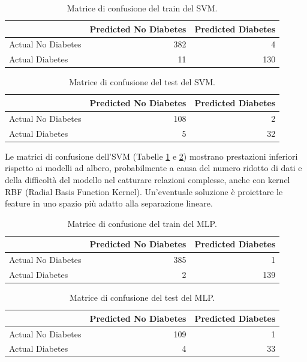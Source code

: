 \documentclass[conference]{IEEEtran}
\begin{document}
\begin{table}[H]
\centering
\small
\begin{tabular}{lrr}
\toprule
 & Predicted No Diabetes & Predicted Diabetes \\
\midrule
Actual No Diabetes & 382 & 4 \\
Actual Diabetes & 11 & 130 \\
\bottomrule
\end{tabular}
\caption{Matrice di confusione del train del SVM.}
\label{tab:SVM_CF_TRAIN}
\end{table}

\begin{table}[H]
\centering
\small
\begin{tabular}{lrr}
\toprule
 & Predicted No Diabetes & Predicted Diabetes \\
\midrule
Actual No Diabetes & 108 & 2 \\
Actual Diabetes & 5 & 32 \\
\bottomrule
\end{tabular}
\caption{Matrice di confusione del test del SVM.}
\label{tab:SVM_CF_TEST}
\end{table}
Le matrici di confusione dell’SVM (Tabelle \ref{tab:SVM_CF_TRAIN} e \ref{tab:SVM_CF_TEST}) mostrano prestazioni inferiori rispetto ai modelli ad albero, probabilmente a causa del numero ridotto di dati e della difficoltà del modello nel catturare relazioni complesse, anche con kernel RBF (Radial Basis Function Kernel). Un’eventuale soluzione è proiettare le feature in uno spazio più adatto alla separazione lineare.

\begin{table}[H]
\centering
\small
\begin{tabular}{lrr}
\toprule
 & Predicted No Diabetes & Predicted Diabetes \\
\midrule
Actual No Diabetes & 385 & 1 \\
Actual Diabetes & 2 & 139 \\
\bottomrule
\end{tabular}
\caption{Matrice di confusione del train del MLP.}
\label{tab:MLP_CF_TRAIN}
\end{table}

\begin{table}[H]
\centering
\small
\begin{tabular}{lrr}
\toprule
 & Predicted No Diabetes & Predicted Diabetes \\
\midrule
Actual No Diabetes & 109 & 1 \\
Actual Diabetes & 4 & 33 \\
\bottomrule
\end{tabular}
\caption{Matrice di confusione del test del MLP.}
\label{tab:MLP_CF_TEST}
\end{table}
\end{document}
